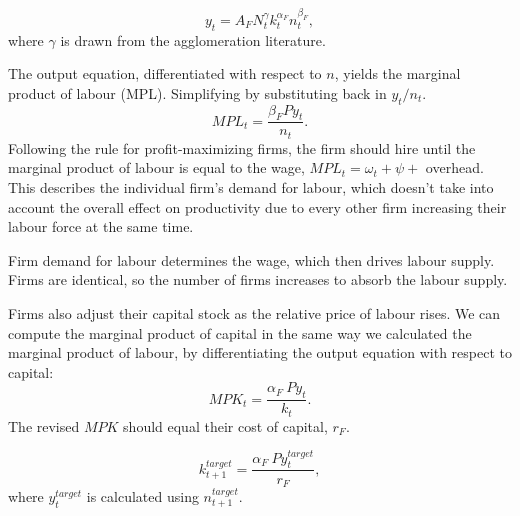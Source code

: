 \begin{equation}
    {y}_t= A_FN_t^\gamma k_t^{\alpha_F}n_t^{\beta_F}, \label{eqn-urban-firm-output}
\end{equation}
where $\gamma$ is drawn from the agglomeration literature.%

The output equation, differentiated with respect to  $n$, yields the marginal product of labour (MPL). Simplifying by substituting back in $y_t/n_t$. %
\begin{equation}MPL_{t} = \frac{\beta_{F}P{y}_{t}} {n_t}. \label{eqn-urban-firm-mpl}
\end{equation} 
Following the rule for profit-maximizing firms, the firm should hire until the marginal product of labour is equal to the wage, $MPL_t= {\omega_t + \psi +}$ overhead. This describes the individual firm's demand for labour, which doesn't take into account the overall effect on productivity due to every other firm increasing their labour force at the same time. 

Firm demand for labour determines the wage, which then drives labour supply. Firms are identical, so the number of firms increases to absorb the labour supply.



Firms also adjust their capital stock as the relative price of labour rises. We can compute the marginal product of capital in the same way we calculated the marginal product of labour, by differentiating the output equation with respect to capital:
\begin{equation} MPK_t = \frac{\alpha_{F}\ P{y}_{t}}{k_{t}}. \label{eqn-urban-firm-mpk}
\end{equation} 
The revised $MPK$ should equal their cost of capital, $r_F$. %

\begin{equation}k_{t+1}^{target}= \frac{\alpha_{F}\ P{y}^{target}_{t}}{r_F},\end{equation}
where  $y_t^{target}$  is calculated using $n^{target}_{t+1}$. %




